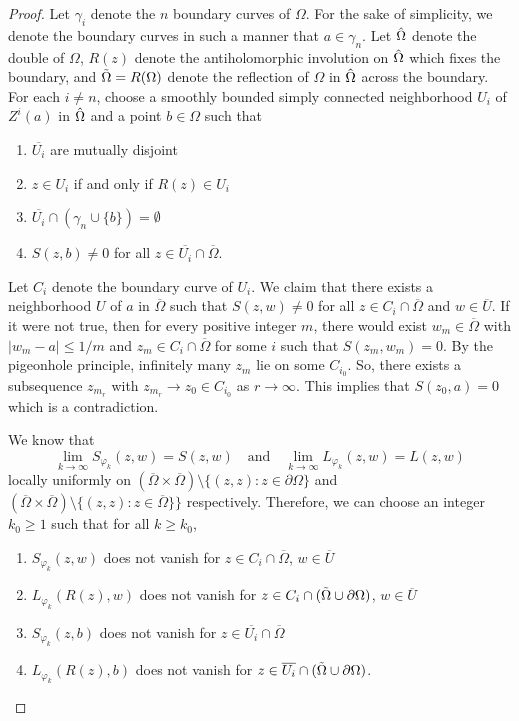 \documentclass[11pt, reqno]{amsart}
\numberwithin{equation}{section}
\newcommand{\ov}{\overline}
\newcommand{\Om}{\Omega}
\begin{document}
	\begin{proof}
		Let $\gamma_i$ denote the $n$ boundary curves of $\Om$. For the sake of simplicity, we denote the boundary curves in such a manner that $a\in \gamma_n$. 
		Let $\Hat{\Om}$ denote the double of $\Om$, $R(z)$ denote the antiholomorphic involution on $\Hat{\Om}$ which fixes the boundary, and $\Tilde{\Om} = R(\Om)$ denote the reflection of $\Om$ in $\Hat{\Om}$ across the boundary. For each $i\neq n$, choose a smoothly bounded simply connected neighborhood $U_i$ of $Z^i(a)$ in $\Hat{\Om}$ and a point $b\in \Om$ such that 
		
		\begin{enumerate}
			\item[(i)] $\overline{U_i}$ are mutually disjoint
			\item[(ii)] $z\in U_i$ if and only if $R(z)\in U_i$
			\item[(iii)] $\ov{U_i}\cap ({\gamma_n \cup \{b\}}) = \emptyset$ 
			\item[(iv)] $S(z,b) \neq 0$ for all $z\in \overline{U_i}\cap \ov{\Om}$.
		\end{enumerate}
		
		\medskip
		
		Let $C_i$ denote the boundary curve of $U_i$. We claim that there exists a neighborhood $U$ of $a$ in $\overline{\Om}$ such that $S(z,w)\neq 0$ for all $z\in C_i\cap \overline{\Om}$ and $w\in \ov{U}$. If it were not true, then for every positive integer $m$, there would exist $w_m\in\ov{\Om}$ with $\vert w_m - a\vert \leq 1/m$ and $z_m\in C_i\cap \overline{\Om}$ for some $i$ such that $S(z_m,w_m) = 0$. By the pigeonhole principle, infinitely many $z_m$ lie on some $C_{i_0}$. So, there exists a subsequence $z_{m_r}$ with $z_{m_r}\rightarrow z_0\in C_{i_0}$ as $r\rightarrow\infty$. This implies that $S(z_0,a) = 0$ which is a contradiction.
		
		\medskip
		
		We know that
		\begin{equation}\label{thms}
			\lim_{k\rightarrow\infty} S_{\varphi_k}(z,w) = S(z,w)
			\quad \text{and}\quad
			\lim_{k\rightarrow\infty} L_{\varphi_k}(z,w) = L(z,w)
		\end{equation}
		locally uniformly on $(\ov{\Om}\times\ov{\Om})\setminus \{(z,z): z\in\partial\Om\}$ and $(\ov{\Om}\times\ov{\Om})\setminus \{(z,z): z\in \overline{\Om}\}\}$ respectively. Therefore, we can choose an integer $k_0 \ge 1$ such that for all $k\geq k_0$, 
		
		\begin{enumerate}
			\item[(i)] $S_{\varphi_k}(z,w)$ does not vanish for $z\in C_i\cap \overline{\Om}$, $w\in \ov{U}$
			\item[(ii)] $L_{\varphi_k}(R(z),w)$ does not vanish for $z\in C_i\cap (\Tilde{\Om}\cup \partial\Om)$, $w\in \ov{U}$
			\item[(iii)] $S_{\varphi_k}(z,b)$ does not vanish for $z\in \ov{U_i}\cap \overline{\Om}$
			\item[(iv)] $L_{\varphi_k}(R(z),b)$ does not vanish for $z\in \ov{U_i}\cap (\Tilde{\Om}\cup \partial\Om)$.
		\end{enumerate}
		

\end{proof}
\end{document}
